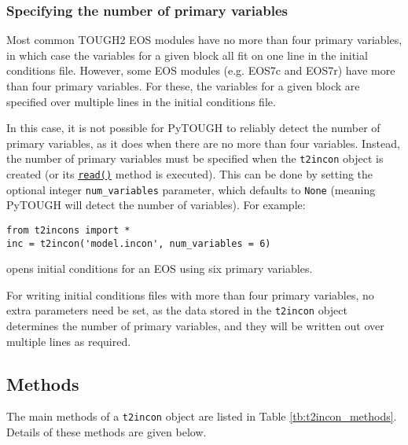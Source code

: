 \subsubsection{Specifying the number of primary variables}

Most common TOUGH2 EOS modules have no more than four primary variables, in which case the variables for a given block all fit on one line in the initial conditions file. However, some EOS modules (e.g. EOS7c and EOS7r) have more than four primary variables. For these, the variables for a given block are specified over multiple lines in the initial conditions file.

In this case, it is not possible for PyTOUGH to reliably detect the number of primary variables, as it does when there are no more than four variables. Instead, the number of primary variables must be specified when the \texttt{t2incon} object is created (or its \hyperref[sec:t2incon:read]{\texttt{read()}} method is executed). This can be done by setting the optional integer \texttt{num\_variables} parameter, which defaults to \texttt{None} (meaning PyTOUGH will detect the number of variables). For example:

\begin{lstlisting}
from t2incons import *
inc = t2incon('model.incon', num_variables = 6)
\end{lstlisting}

opens initial conditions for an EOS using six primary variables.

For writing initial conditions files with more than four primary variables, no extra parameters need be set, as the data stored in the \texttt{t2incon} object determines the number of primary variables, and they will be written out over multiple lines as required.

\subsection{Methods}

The main methods of a \texttt{t2incon} object are listed in Table \ref{tb:t2incon_methods}.  Details of these methods are given below.

